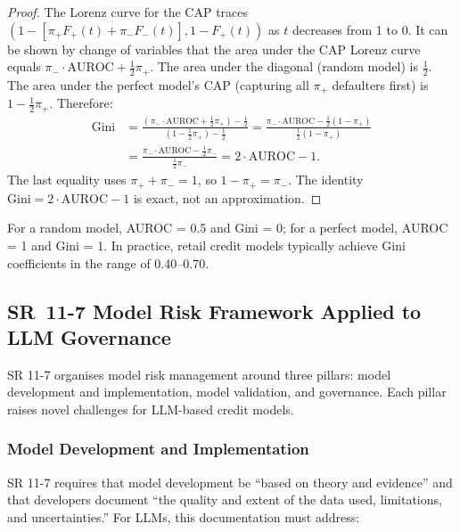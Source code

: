 \begin{context}
\begin{proof}
The Lorenz curve for the CAP traces $(1 - [\pi_+ F_+(t) + \pi_- F_-(t)], 1 - F_+(t))$ as $t$ decreases from 1 to 0. It can be shown by change of variables that the area under the CAP Lorenz curve equals $\pi_- \cdot \text{AUROC} + \tfrac{1}{2}\pi_+$. The area under the diagonal (random model) is $\tfrac{1}{2}$. The area under the perfect model's CAP (capturing all $\pi_+$ defaulters first) is $1 - \tfrac{1}{2}\pi_+$. Therefore:
\begin{equation}
\begin{aligned}
  \text{Gini} &= \frac{(\pi_- \cdot \text{AUROC} + \tfrac{1}{2}\pi_+) - \tfrac{1}{2}}{(1 - \tfrac{1}{2}\pi_+) - \tfrac{1}{2}}
              = \frac{\pi_- \cdot \text{AUROC} - \tfrac{1}{2}(1-\pi_+)}{\tfrac{1}{2}(1 - \pi_+)} \\
              &= \frac{\pi_- \cdot \text{AUROC} - \tfrac{1}{2}\pi_-}{\tfrac{1}{2}\pi_-}
              = 2 \cdot \text{AUROC} - 1.
\end{aligned}
  \label{eq:gini-proof}
\end{equation}
The last equality uses $\pi_+ + \pi_- = 1$, so $1 - \pi_+ = \pi_-$. The identity $\text{Gini} = 2 \cdot \text{AUROC} - 1$ is exact, not an approximation.
\end{proof}

For a random model, AUROC = 0.5 and Gini = 0; for a perfect model, AUROC = 1 and Gini = 1. In practice, retail credit models typically achieve Gini coefficients in the range of 0.40--0.70.

\subsection{SR~11-7 Model Risk Framework Applied to LLM Governance}
\label{subsec:sr117}

SR 11-7 \cite{sr117} organises model risk management around three pillars: model development and implementation, model validation, and governance. Each pillar raises novel challenges for LLM-based credit models.

\subsubsection*{Model Development and Implementation}

SR 11-7 requires that model development be ``based on theory and evidence'' and that developers document ``the quality and extent of the data used, limitations, and uncertainties.'' For LLMs, this documentation must address:


\end{context}
